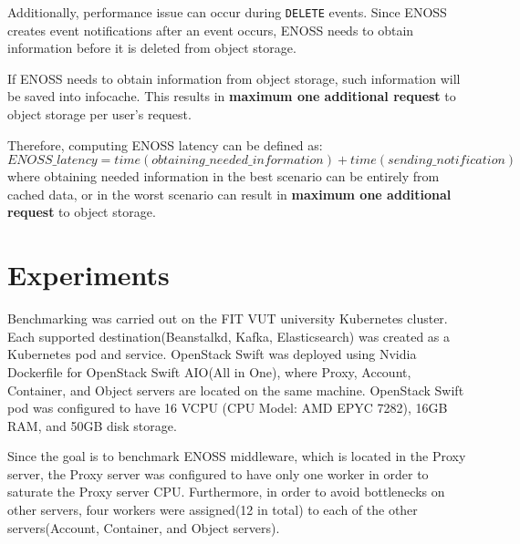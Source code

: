     Additionally, performance issue can occur during \texttt{DELETE} events. Since ENOSS creates event notifications after an event occurs, ENOSS needs to obtain information before it is deleted from object storage.

    If ENOSS needs to obtain information from object storage, such information will be saved into infocache. This results in \textbf{maximum one additional request} to object storage per user's request.

    Therefore, computing ENOSS latency can be defined as:
    \texttt{\[ENOSS\_latency = time(obtaining\_needed\_information) + time(sending\_notification)\]}
    where obtaining needed information in the best scenario can be entirely from cached data, or in the worst scenario can result in \textbf{maximum one additional request} to object storage.

    \section{Experiments}
    Benchmarking was carried out on the FIT VUT university Kubernetes cluster. Each supported destination(Beanstalkd, Kafka, Elasticsearch) was created as a Kubernetes pod and service. OpenStack Swift was deployed using Nvidia Dockerfile for OpenStack Swift AIO(All in One), where Proxy, Account, Container, and Object servers are located on the same machine. OpenStack Swift pod was configured to have 16 VCPU (CPU Model: AMD EPYC 7282), 16GB RAM, and 50GB disk storage.

    Since the goal is to benchmark ENOSS middleware, which is located in the Proxy server, the Proxy server was configured to have only one worker in order to saturate the Proxy server CPU. Furthermore, in order to avoid bottlenecks on other servers, four workers were assigned(12 in total) to each of the other servers(Account, Container, and Object servers).

